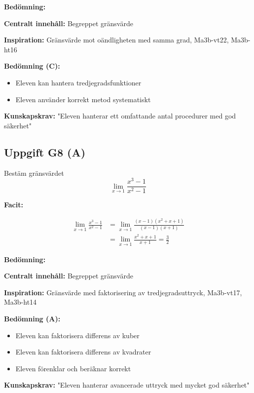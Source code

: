 \documentclass[12pt]{article}
\begin{document}
\begin{refbox}
\textbf{Bedömning:}

\textbf{Centralt innehåll:} Begreppet gränsvärde

\textbf{Inspiration:} Gränsvärde mot oändligheten med samma grad, Ma3b-vt22, Ma3b-ht16

\textbf{Bedömning (C):}
\begin{itemize}
    \item Eleven kan hantera tredjegradsfunktioner
    \item Eleven använder korrekt metod systematiskt
\end{itemize}

\textbf{Kunskapskrav:} "Eleven hanterar ett omfattande antal procedurer med god säkerhet"
\end{refbox}

\subsection*{Uppgift G8 (A)}
Bestäm gränsvärdet
\[
\lim_{x \to 1} \frac{x^3 - 1}{x^2 - 1}
\]

\begin{facitbox}
\textbf{Facit:}

\begin{align*}
\lim_{x \to 1} \frac{x^3 - 1}{x^2 - 1} &= \lim_{x \to 1} \frac{(x - 1)(x^2 + x + 1)}{(x - 1)(x + 1)} \\
&= \lim_{x \to 1} \frac{x^2 + x + 1}{x + 1} = \frac{3}{2}
\end{align*}
\end{facitbox}

\begin{refbox}
\textbf{Bedömning:}

\textbf{Centralt innehåll:} Begreppet gränsvärde

\textbf{Inspiration:} Gränsvärde med faktorisering av tredjegradsuttryck, Ma3b-vt17, Ma3b-ht14

\textbf{Bedömning (A):}
\begin{itemize}
    \item Eleven kan faktorisera differens av kuber
    \item Eleven kan faktorisera differens av kvadrater
    \item Eleven förenklar och beräknar korrekt
\end{itemize}

\textbf{Kunskapskrav:} "Eleven hanterar avancerade uttryck med mycket god säkerhet"
\end{refbox}
\end{document}
